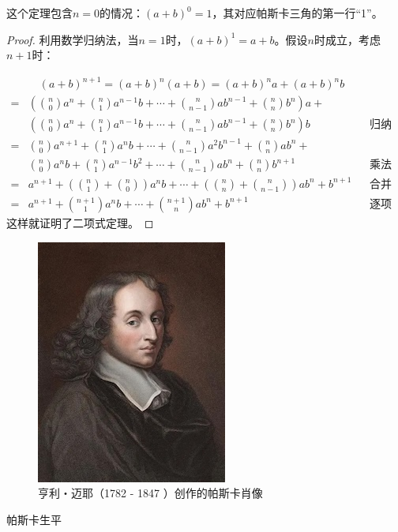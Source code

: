 \documentclass[b5paper]{ctexart}
\begin{document}
这个定理包含$n=0$的情况：$(a+b)^0 = 1$，其对应帕斯卡三角的第一行“1”。

\begin{proof}
利用数学归纳法，当$n = 1$时，$(a + b)^1 = a + b$。假设$n$时成立，考虑$n + 1$时：

\begin{align*}
 &\quad (a + b)^{n+1} = (a+b)^n(a + b) = (a + b)^n a + (a + b)^n b \\
= & (\binom{n}{0}a^n + \binom{n}{1}a^{n-1}b + \dotsb + \binom{n}{n-1}ab^{n-1} + \binom{n}{n}b^n)a + \\
 &(\binom{n}{0}a^n + \binom{n}{1}a^{n-1}b + \dotsb + \binom{n}{n-1}ab^{n-1} + \binom{n}{n}b^n)b &&\text{归纳假设} \\
= & \binom{n}{0}a^{n+1} + \binom{n}{1}a^nb + \dotsb + \binom{n}{n-1}a^2b^{n-1} + \binom{n}{n}ab^n + \\
 & \binom{n}{0}a^nb + \binom{n}{1}a^{n-1}b^2 + \dotsb + \binom{n}{n-1}ab^n + \binom{n}{n}b^{n+1} &&\text{乘法分配律} \\
= & a^{n+1} + (\binom{n}{1} + \binom{n}{0})a^nb + \dotsb + (\binom{n}{n} + \binom{n}{n-1})ab^n + b^{n+1} &&\text{合并同类项} \\
= & a^{n+1} + \binom{n+1}{1}a^nb + \dotsb + \binom{n+1}{n}ab^n + b^{n+1} && \text{逐项用帕斯卡法则}
\end{align*}
这样就证明了二项式定理。
\end{proof}

\begin{figure}[htbp]
  \centering
  \includegraphics[scale=0.5]{img/Pascal}
  \caption{亨利・迈耶（1782 - 1847 ）创作的帕斯卡肖像}
 \label{fig:Pascal}
\end{figure}

\begin{mdframed}
帕斯卡生平
\end{mdframed}
\end{document}
